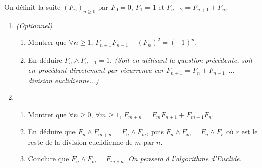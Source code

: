 
On définit la suite $(F_n)_{n \ge 0}$ par $F_0 = 0 $, $F_1 =1$ et $F_{n+2} = F_{n+1} + F_n$.

\begin{enumerate}

    \item \emph{(Optionnel)} \begin{enumerate}\item Montrer que $\forall n \ge 1$, $F_{n+1} F_{n-1} - (F_n)^2 = (-1)^n$.

        \item En déduire $F_n \wedge F_{n+1} = 1$. \emph{(Soit en utilisant la
                question précédente, soit en procédant directement 
                par récurrence car $F_{n+1} = F_n + F_{n-1}$ ... division
                euclidienne...)}
\end{enumerate}

\item \begin{enumerate}

\item Montrer que $\forall n \ge 0$, $\forall m \ge 1$, $F_{m+n} = F_m F_{n+1} + F_{m-1} F_n$.

\item En déduire que $F_n \wedge F_{m+n} = F_n \wedge F_m$, puis $F_n \wedge F_{m} = F_n \wedge F_r$ où $r$ est le reste de la division euclidienne de $m$ par $n$.

\item Conclure que $F_n \wedge F_{m} = F_{m \wedge n}$. \emph{On pensera à l'algorithme d'Euclide.}

\end{enumerate}

\end{enumerate}




